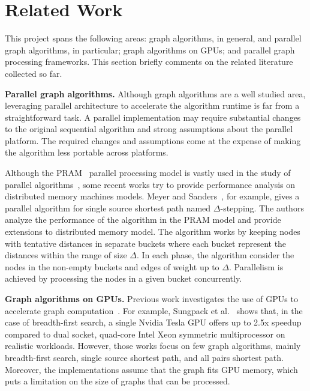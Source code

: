 \section{Related Work}
\label{sec:related}

This project spans the following areas: graph algorithms, in general, and parallel graph algorithms, in particular; graph algorithms on GPUs; and parallel graph processing frameworks. This section briefly comments on the related literature collected so far.

{\bf Parallel graph algorithms.} Although graph algorithms are a well studied area, leveraging parallel architecture to accelerate the algorithm runtime is far from a straightforward task. A parallel implementation may require substantial changes to the original sequential algorithm and strong assumptions about the parallel platform. The required changes and assumptions come at the expense of making the algorithm less portable across platforms.

Although the PRAM~\cite{Fortune78} parallel processing model is vastly used in the study of parallel algorithms~\cite{Quinn1984,Atallah1984}, some recent works try to provide performance analysis on distributed memory machines models. Meyer and Sanders~\cite{Meyer2003}, for example, gives a parallel algorithm for single source shortest path named $\Delta$-stepping. The authors analyze the performance of the algorithm in the PRAM model and provide extensions to distributed memory model. The algorithm works by keeping nodes with tentative distances in separate buckets where each bucket represent the distances within the range of size $\Delta$. In each phase, the algorithm consider the nodes in the non-empty buckets and edges of weight up to $\Delta$. Parallelism is achieved by processing the nodes in a given bucket concurrently. 

{\bf Graph algorithms on GPUs.} Previous work investigates the use of GPUs to accelerate graph computation~\cite{Harish2007, Katz2008, Sungpack2010, dehne2010exploring}. For example, Sungpack et al.~\cite{Sungpack2010} shows that, in the case of breadth-first search, a single Nvidia Tesla GPU offers up to 2.5x speedup compared to dual socket, quad-core Intel Xeon symmetric multiprocessor on realistic workloads. However, those works focus on few graph algorithms, mainly breadth-first search, single source shortest path, and all pairs shortest path. Moreover, the implementations assume that the graph fits GPU memory, which puts a limitation on the size of graphs that can be processed. 

